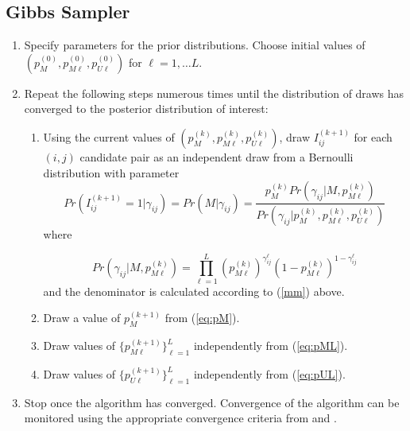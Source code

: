 \documentclass[11pt,reqno]{amsart}
\begin{document}
\subsection{Gibbs Sampler \citep{larsen_2005}}
\label{app:simple_gibbs}
\begin{enumerate}
\item Specify parameters for the prior distributions.  Choose initial values of $\left(p_M^{(0)}, p_{M\ell}^{(0)}, p_{U\ell}^{(0)}\right)$ for $\ell=1,\dots L$.  

\item Repeat the following steps numerous times until the distribution of draws has converged to the posterior distribution of interest:
\begin{enumerate}

\item Using the current values of $\left(p_M^{(k)}, p_{M\ell}^{(k)}, p_{U\ell}^{(k)}\right)$, draw $I_{ij}^{(k+1)}$ for each $(i,j)$ candidate pair as an independent draw from a Bernoulli distribution with parameter
\begin{equation}
Pr\left( I_{ij}^{(k+1)}=1 \Big| \gamma_{ij}\right) = Pr\left(M | \gamma_{ij}\right) = \frac{p_M^{(k)}Pr\left(\gamma_{ij} | M, p_{M\ell}^{(k)} \right)}{Pr\left(\gamma_{ij} \Big | p_M^{(k)}, p_{M\ell}^{(k)}, p_{U\ell}^{(k)}\right)}
\end{equation} where 

$$ Pr\left(\gamma_{ij} | M, p_{M\ell}^{(k)} \right) = \prod_{\ell=1}^L  \left(p_{M\ell}^{(k)}\right)^{\gamma_{ij}^{\ell}}\left(1-p_{M\ell}^{(k)}\right)^{1-\gamma_{ij}^{\ell}}$$ and the denominator is calculated according to (\ref{mm}) above. 
\item Draw a value of $p_M^{(k+1)}$ from (\ref{eq:pM}).
\item Draw values of $\{p_{M\ell}^{(k+1)}\}_{\ell=1}^L$ independently from (\ref{eq:pML}). 
\item Draw values of $\{p_{U\ell}^{(k+1)}\}_{\ell=1}^L$ independently from (\ref{eq:pUL}). 
\end{enumerate}
\item Stop once the algorithm has converged.  Convergence of the algorithm can be monitored using the appropriate convergence criteria from \cite{brooks_gelman_1998} and  \cite{gelman_rubin_1992}.
\end{enumerate}
\end{document}
